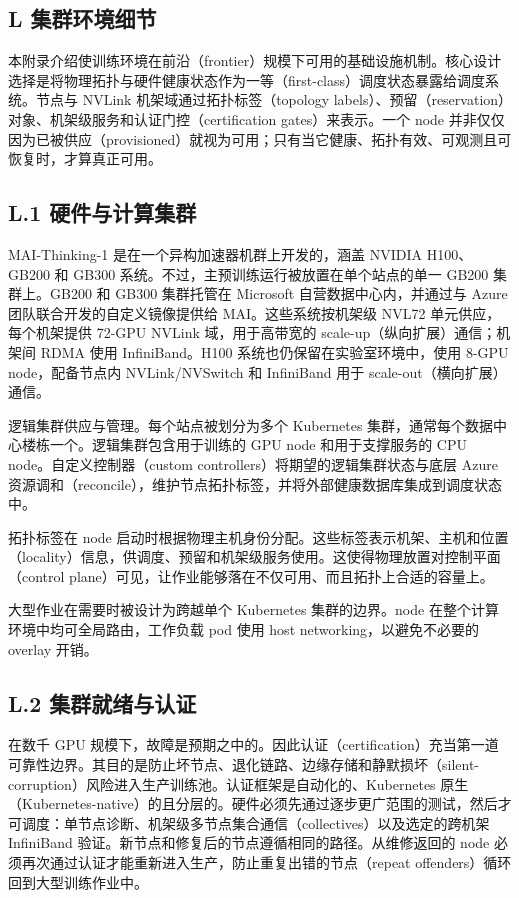 \subsection{L 集群环境细节}\label{l-cluster-environment-details}

本附录介绍使训练环境在前沿（frontier）规模下可用的基础设施机制。核心设计选择是将物理拓扑与硬件健康状态作为一等（first-class）调度状态暴露给调度系统。节点与 NVLink 机架域通过拓扑标签（topology labels）、预留（reservation）对象、机架级服务和认证门控（certification gates）来表示。一个 node 并非仅仅因为已被供应（provisioned）就视为可用；只有当它健康、拓扑有效、可观测且可恢复时，才算真正可用。

\subsection{L.1 硬件与计算集群}\label{l.1-hardware-and-compute-clusters}

MAI-Thinking-1 是在一个异构加速器机群上开发的，涵盖 NVIDIA H100、GB200 和 GB300 系统。不过，主预训练运行被放置在单个站点的单一 GB200 集群上。GB200 和 GB300 集群托管在 Microsoft 自营数据中心内，并通过与 Azure 团队联合开发的自定义镜像提供给 MAI。这些系统按机架级 NVL72 单元供应，每个机架提供 72-GPU NVLink 域，用于高带宽的 scale-up（纵向扩展）通信；机架间 RDMA 使用 InfiniBand。H100 系统也仍保留在实验室环境中，使用 8-GPU node，配备节点内 NVLink/NVSwitch 和 InfiniBand 用于 scale-out（横向扩展）通信。

逻辑集群供应与管理。每个站点被划分为多个 Kubernetes 集群，通常每个数据中心楼栋一个。逻辑集群包含用于训练的 GPU node 和用于支撑服务的 CPU node。自定义控制器（custom controllers）将期望的逻辑集群状态与底层 Azure 资源调和（reconcile），维护节点拓扑标签，并将外部健康数据库集成到调度状态中。

拓扑标签在 node 启动时根据物理主机身份分配。这些标签表示机架、主机和位置（locality）信息，供调度、预留和机架级服务使用。这使得物理放置对控制平面（control plane）可见，让作业能够落在不仅可用、而且拓扑上合适的容量上。

大型作业在需要时被设计为跨越单个 Kubernetes 集群的边界。node 在整个计算环境中均可全局路由，工作负载 pod 使用 host networking，以避免不必要的 overlay 开销。

\subsection{L.2 集群就绪与认证}\label{l.2-cluster-readiness-and-certification}

在数千 GPU 规模下，故障是预期之中的。因此认证（certification）充当第一道可靠性边界。其目的是防止坏节点、退化链路、边缘存储和静默损坏（silent-corruption）风险进入生产训练池。认证框架是自动化的、Kubernetes 原生（Kubernetes-native）的且分层的。硬件必须先通过逐步更广范围的测试，然后才可调度：单节点诊断、机架级多节点集合通信（collectives）以及选定的跨机架 InfiniBand 验证。新节点和修复后的节点遵循相同的路径。从维修返回的 node 必须再次通过认证才能重新进入生产，防止重复出错的节点（repeat offenders）循环回到大型训练作业中。

